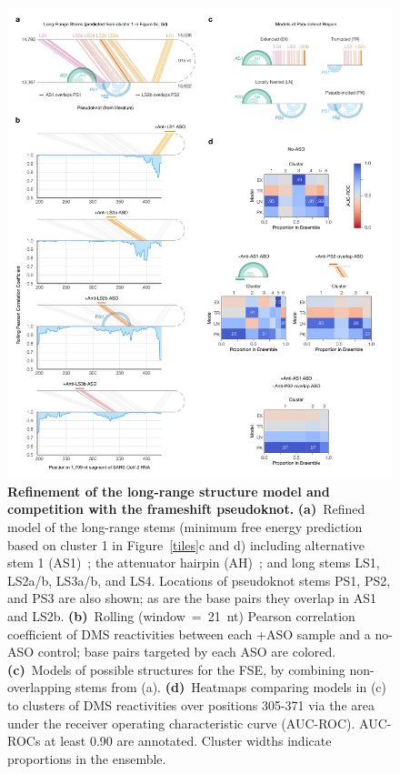 \documentclass[main.tex]{subfiles}
\begin{document}
\begin{figure}[H]
	\includegraphics[width=\textwidth]{../MainFigures/lnas/lnas.png}
	\caption{\textbf{Refinement of the long-range structure model and competition with the frameshift pseudoknot.} \textbf{(a)}~Refined model of the long-range stems (minimum free energy prediction based on cluster 1 in Figure~\ref{tiles}c and d) including alternative stem 1 (AS1)~\cite{Lan2022}; the attenuator hairpin (AH)~\cite{Su2005}; and long stems LS1, LS2a/b, LS3a/b, and LS4. Locations of pseudoknot stems PS1, PS2, and PS3 are also shown; as are the base pairs they overlap in AS1 and LS2b. \textbf{(b)}~Rolling (window~=~21~nt) Pearson correlation coefficient of DMS reactivities between each +ASO sample and a no-ASO control; base pairs targeted by each ASO are colored. \textbf{(c)}~Models of possible structures for the FSE, by combining non-overlapping stems from (a). \textbf{(d)}~Heatmaps comparing models in (c) to clusters of DMS reactivities over positions 305-371 via the area under the receiver operating characteristic curve (AUC-ROC). AUC-ROCs at least 0.90 are annotated. Cluster widths indicate proportions in the ensemble.}
	\label{lnas}
\end{figure}
\end{document}
